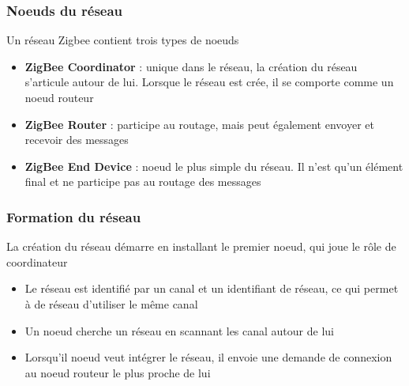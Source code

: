 \documentclass{beamer}
\begin{document}
  \begin{frame}
   \frametitle{Noeuds du réseau}
   \begin{block}{Un réseau Zigbee contient trois types de noeuds}
    \begin{itemize}
     \item \textbf{ZigBee Coordinator} : unique dans le réseau, la création du réseau s'articule autour de lui. Lorsque le réseau est crée, il se comporte comme un noeud routeur
     \item \textbf{ZigBee Router} : participe au routage, mais peut également envoyer et recevoir des messages
     \item \textbf{ZigBee End Device} : noeud le plus simple du réseau. Il n'est qu'un élément final et ne participe pas au routage des messages
    \end{itemize}
   \end{block}
  \end{frame}
  
  \begin{frame}
   \frametitle{Formation du réseau}
   \begin{block}{La création du réseau démarre en installant le premier noeud, qui joue le rôle de coordinateur}
    \begin{itemize}
     \item Le réseau est identifié par un canal et un identifiant de réseau, ce qui permet à de réseau d'utiliser le même canal
     \item Un noeud cherche un réseau en scannant les canal autour de lui
     \item Lorsqu'il noeud veut intégrer le réseau, il envoie une demande de connexion au noeud routeur le plus proche de lui 
    \end{itemize}
   \end{block}
  \end{frame}
\end{document}
